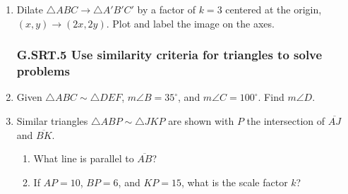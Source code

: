 \documentclass[12pt, twoside]{article}
\begin{document}
\begin{enumerate}[itemsep=0.5cm]
\item Dilate $\triangle ABC \rightarrow \triangle A'B'C'$ by a factor of $k=3$ centered at the origin, \\
$(x,y) \rightarrow (2x, 2y)$. Plot and label the image on the axes.
  \begin{center}
  \end{center}

\newpage
\subsubsection*{G.SRT.5 Use similarity criteria for triangles to solve problems}
\item Given $\triangle ABC \sim \triangle DEF$, $m\angle B=35^\circ$, and $m\angle C=100^\circ$. Find $m\angle D$. \vspace{4cm}


\item Similar triangles $\triangle ABP \sim \triangle JKP$ are shown with $P$ the intersection of $\overline{AJ}$ and $\overline{BK}$.
\begin{multicols}{2}
  \begin{enumerate}
      \item What line is parallel to $\overline{AB}$?
      \item If $AP = 10$, $BP = 6$, and $KP = 15$, what is the scale factor $k$? \vspace{2cm}
      \end{enumerate}
  \end{multicols}
    \vspace{1cm}


\end{enumerate}
\end{document}
